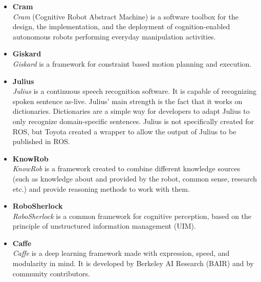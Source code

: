 \documentclass[main.tex]{subfiles}
\begin{document}
			\begin{itemize}
				\item{\textbf{Cram}} \\
					 \textit{Cram} (Cognitive Robot Abstract Machine) is a software toolbox for the design, the implementation, and the deployment of cognition-enabled autonomous robots performing everyday manipulation activities.
				\item{\textbf{Giskard}} \\
					\textit{Giskard} is a  framework for constraint based motion planning and execution.
				\item{\textbf{Julius}} \\
					\textit{Julius} is a continuous speech recognition software. It is capable of recognizing spoken sentence as-live. Julius' main strength is the fact that it works on dictionaries. Dictionaries are a simple way for developers to adapt Julius to only recognize domain-specific sentences. Julius is not specifically created for ROS, but Toyota created a wrapper to allow the output of Julius to be published in ROS.
				\item{\textbf{KnowRob}} \\
				    \textit{KnowRob} is a framework created to combine different knowledge sources (such as knowledge about and provided by the robot, common sense, research etc.) and provide reasoning methods to work with them. 
				\item{\textbf{RoboSherlock}} \\
					\textit{RoboSherlock} is a common framework for cognitive perception, based on the principle of unstructured information management (UIM).
				\item{\textbf{Caffe}} \\
					\textit{Caffe} is a deep learning framework made with expression, speed, and modularity in mind. It is developed by Berkeley AI Research (BAIR) and by community contributors.
			\end{itemize}
	  		 

	\endgroup
\end{document}
